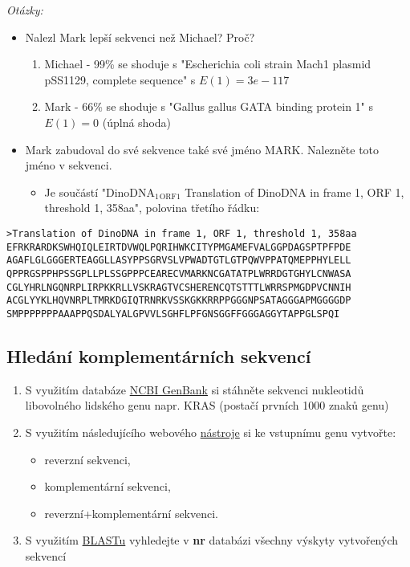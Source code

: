 \documentclass[11pt]{article}
\begin{document}
\emph{Otázky:}
\begin{itemize}
\item Nalezl Mark lepší sekvenci než Michael? Proč?
\begin{enumerate}
\item Michael - 99\% se shoduje s "Escherichia coli strain Mach1 plasmid pSS1129, complete
sequence" s \(E(1) = 3e-117\)
\item Mark - 66\% se shoduje s "Gallus gallus GATA binding protein 1" s \(E(1) = 0\) (úplná shoda)
\end{enumerate}
\item Mark zabudoval do své sekvence také své jméno MARK. Nalezněte toto jméno v
sekvenci.
\begin{itemize}
\item Je součástí "DinoDNA\(_{\text{1}}\)\(_{\text{ORF1}}\)  Translation of DinoDNA in frame 1, ORF 1,
threshold 1, 358aa", polovina třetího řádku:
\end{itemize}
\end{itemize}
\begin{verbatim}
>Translation of DinoDNA in frame 1, ORF 1, threshold 1, 358aa
EFRKRARDKSWHQIQLEIRTDVWQLPQRIHWKCITYPMGAMEFVALGGPDAGSPTPFPDE
AGAFLGLGGGERTEAGGLLASYPPSGRVSLVPWADTGTLGTPQWVPPATQMEPPHYLELL
QPPRGSPPHPSSGPLLPLSSGPPPCEARECVMARKNCGATATPLWRRDGTGHYLCNWASA
CGLYHRLNGQNRPLIRPKKRLLVSKRAGTVCSHERENCQTSTTTLWRRSPMGDPVCNNIH
ACGLYYKLHQVNRPLTMRKDGIQTRNRKVSSKGKKRRPPGGGNPSATAGGGAPMGGGGDP
SMPPPPPPPAAAPPQSDALYALGPVVLSGHFLPFGNSGGFFGGGAGGYTAPPGLSPQI
\end{verbatim}

\subsection{Hledání komplementárních sekvencí}
\label{sec:org314f798}
\begin{enumerate}
\item S využitím databáze \href{http://www.ncbi.nlm.nih.gov/genbank/}{NCBI GenBank} si stáhněte sekvenci nukleotidů libovolného
lidského genu napr. KRAS (postačí prvních 1000 znaků genu)
\item S využitím následujícího webového \href{http://www.bioinformatics.org/sms/rev\_comp.html}{nástroje} si ke vstupnímu genu vytvořte:
\begin{itemize}
\item reverzní sekvenci,
\item komplementární sekvenci,
\item reverzní+komplementární sekvenci.
\end{itemize}

\item S využitím \href{http://blast.ncbi.nlm.nih.gov/Blast.cgi}{BLASTu} vyhledejte v \textbf{nr} databázi všechny výskyty vytvořených
sekvencí
\end{enumerate}
\end{document}
